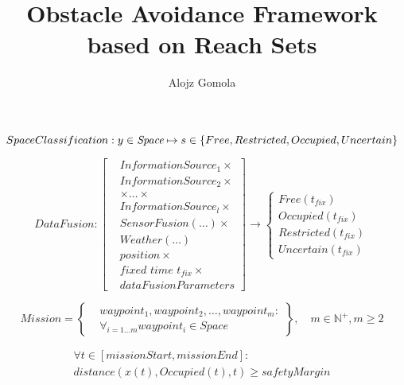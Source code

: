 \documentclass[a4paper,narrowmargins,12pt,twoside,openright,onehalfspaced,singlespacednotes]{fcup-thesis}
\author{Alojz Gomola}
\title{Obstacle Avoidance Framework based on Reach Sets}
\theoremstyle{plain}
\theoremstyle{plain}
\theoremstyle{remark}
\newcommand{\N}{\mathbb{N}}
\begin{document}
	\setcounter{chapter}{4}
	\setcounter{equation}{9}
	\begin{equation}\label{eq:spaceCassificationFunction}
        SpaceClassification: y \in \emph{Space} \mapsto s \in \{Free, Restricted, Occupied, Uncertain \}
    \end{equation}
	
	\setcounter{chapter}{4}
	\setcounter{equation}{18}
	\begin{equation}\label{eq:DataFusionFunction}
        DataFusion:
        \left[
        \begin{aligned}
            &InformationSource_1 \times\\
            &InformationSource_2 \times\\
            &\times\dots\times\\
            &InformationSource_l \times\\
            &SensorFusion(\dots)\times\\
            &Weather(\dots)\\
            &position\times\\
            &\textit{fixed time }t_{fix}\times\\
            &dataFusionParameters
        \end{aligned}
        \right]
        \to 
        \begin{cases}
            Free(t_{fix})\\
            Occupied(t_{fix})\\
            Restricted(t_{fix})\\
            Uncertain(t_{fix})
        \end{cases}
    \end{equation}

	\setcounter{chapter}{4}
	\setcounter{equation}{5}
	\begin{equation}\label{eq:missionAbstractSet}
        Mission = \left\{
        \begin{aligned}
            &waypoint_1, waypoint_2, \dots,waypoint_m:\\
            &\forall_{i=1\dots m} waypoint_i \in  Space
        \end{aligned}
        \right\}, \quad m\in\N^{+},m\ge2
    \end{equation}
	
	\setcounter{chapter}{4}
	\setcounter{equation}{20}
	\begin{multline}\label{eq:safetyMarginAbstract}
        \forall t\in [missionStart,missionEnd]:\\distance(x(t),Occupied(t),t) \ge safetyMargin
    \end{multline}
	
\end{document}
